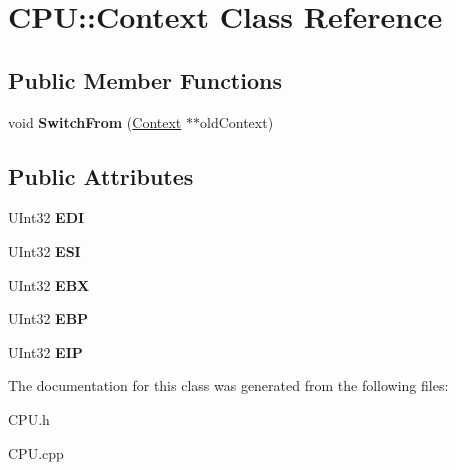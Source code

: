 \hypertarget{class_c_p_u_1_1_context}{}\section{C\+PU\+:\+:Context Class Reference}
\label{class_c_p_u_1_1_context}
\subsection*{Public Member Functions}
\begin{DoxyCompactItemize}
\item 
\mbox{\label{class_c_p_u_1_1_context_a1eb39f75ff9c4b407f184856ebfea95f}} 
void {\bfseries Switch\+From} (\hyperlink{class_c_p_u_1_1_context}{Context} $\ast$$\ast$old\+Context)
\end{DoxyCompactItemize}
\subsection*{Public Attributes}
\begin{DoxyCompactItemize}
\item 
\mbox{\label{class_c_p_u_1_1_context_a847a35a0d7e4387990dd68b83b358a17}} 
U\+Int32 {\bfseries E\+DI}
\item 
\mbox{\label{class_c_p_u_1_1_context_a8d5c58ab23deaae070bd2021ebcc98b4}} 
U\+Int32 {\bfseries E\+SI}
\item 
\mbox{\label{class_c_p_u_1_1_context_acd814048ec2badce7560895f1b914ab0}} 
U\+Int32 {\bfseries E\+BX}
\item 
\mbox{\label{class_c_p_u_1_1_context_a16c8fa29ff62dad9337ba34afd02bec1}} 
U\+Int32 {\bfseries E\+BP}
\item 
\mbox{\label{class_c_p_u_1_1_context_aa41a3763abc75e81562b96a5e9d1907a}} 
U\+Int32 {\bfseries E\+IP}
\end{DoxyCompactItemize}


The documentation for this class was generated from the following files\+:\begin{DoxyCompactItemize}
\item 
C\+P\+U.\+h\item 
C\+P\+U.\+cpp\end{DoxyCompactItemize}
